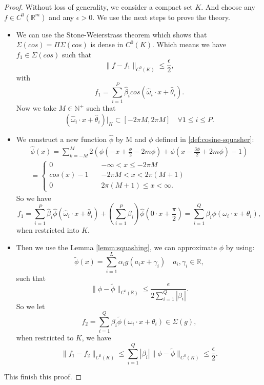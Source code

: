 \begin{proof}
Without loss of generality, we consider a compact set $K$. And choose any $f \in C^{0}(\mathbb{R}^m)$ and any $\epsilon > 0$. We use the next steps to prove the theory.
\begin{itemize}
\item We can use the Stone-Weierstrass theorem which shows that $\Sigma(cos) = \Pi \Sigma(cos)$ is dense in $C^0(K)$. Which means we have $f_1 \in \Sigma(cos)$ such that 
$$
\|f - f_1\|_{C^{0}(K)} \le \frac{\epsilon}{2},
$$
with 
$$f_1 = \sum_{i=1}^P \hat \beta_i cos(\hat\omega_i \cdot x + \hat\theta_i).$$
Now we take $M \in \mathbb{N}^{+}$ such that 
$$
(\hat\omega_i \cdot x + \hat\theta_i) |_K \subset [-2\pi M, 2\pi M] \quad \forall 1\le i \le P.
$$
\item We construct a new function $\hat{\phi}$ by M and $\phi$ defined in \ref{def:cosine-squasher}:
\begin{align}
\hat{\phi}(x) = \sum_{k = -M}^{M} 2(\phi(-x + \frac{\phi}{2} - 2m\phi) + \phi(x - \frac{3\phi}{2} + 2m\phi) - 1) \\=  
\begin{cases}
0 & -\infty < x \le -2\pi M \\
cos(x) - 1 \quad &-2\pi M < x < 2\pi (M+1) \\
0 &  2\pi(M+1)\le x < \infty. 
\end{cases}
\end{align}
So we have 
\begin{equation}
f_1  = \sum_{i=1}^P \hat\beta_i \hat{\phi}(\hat\omega_i \cdot x + \hat\theta_i) + (\sum_{i=1}^P \beta_i )\hat{\phi}(0\cdot x + \frac{\pi}{2}) = \sum_{i=1}^Q\beta_i \phi(\omega_i \cdot x +  \theta_i),
\end{equation}
when restricted into $K$.



\item Then we use the Lemma \ref{lemm:squashing}, we can approximate $\phi$ by using:
$$
\tilde \phi(x) = \sum_{i=1}^{L} \alpha_ig(a_ix + \gamma_i) \quad a_i, \gamma_i \in \mathbb{R},
$$
such that
$$
\|\phi - \tilde \phi \|_{C^{0}(\mathbb{R})} \le \frac{\epsilon}{ 2 \sum_{i=1}^{Q} |\beta_i|}.
$$
So we let
$$
f_2 = \sum_{i=1}^Q \beta_i \tilde \phi(\omega_i \cdot x + \theta_i) \in \Sigma(g),
$$
when restricted to $K$, we have
$$
\|f_1 - f_2\|_{C^0(K)} \le \sum_{i=1}^{Q} |\beta_i| \| \phi - \tilde \phi \|_{C^0(K)} \le \frac{\epsilon}{2}.
$$
\end{itemize}

This finish this proof.
\end{proof}

